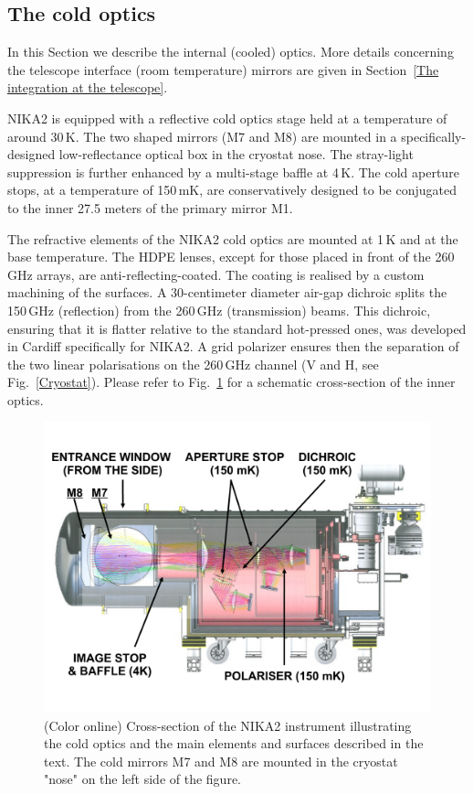 \documentclass[]{aa} %
\begin{document}
 \subsection{The cold optics}

In this Section we describe the internal (cooled) optics. More details concerning the telescope interface (room temperature) mirrors are given in Section~\ref{The integration at the telescope}.

NIKA2 is equipped with a reflective cold optics stage held at a temperature of around 30\,K. The two shaped mirrors (M7 and M8) are mounted in a specifically-designed low-reflectance optical box in the cryostat nose. The stray-light suppression is further enhanced by a multi-stage baffle at 4\,K. The cold aperture stops, at a temperature of 150\,mK, are conservatively designed to be conjugated to the inner 27.5 meters of the primary mirror M1.

The refractive elements of the NIKA2 cold optics are mounted at 1\,K and at the base temperature. The HDPE lenses, except for those placed in front of the 260\,GHz arrays, are anti-reflecting-coated. The coating is realised by a custom machining of the surfaces. A 30-centimeter diameter air-gap dichroic splits the 150\,GHz (reflection) from the 260\,GHz (transmission) beams. This dichroic, ensuring that it is flatter relative to the standard hot-pressed ones, was developed in Cardiff specifically for NIKA2. A grid polarizer ensures then the separation of the two linear polarisations on the 260\,GHz channel (V and H, see Fig.~\ref{Cryostat}). Please refer to Fig.~\ref{Cryostat_optics} for a schematic cross-section of the inner optics.

\begin{figure}[h]
   \centering
   \includegraphics[width=.95\linewidth]{NIKA2_optics.pdf}
      \caption{(Color online) Cross-section of the NIKA2 instrument illustrating the cold optics and the main elements and surfaces described in the text. The cold mirrors M7 and M8 are mounted in the cryostat "nose" on the left side of the figure.}
         \label{Cryostat_optics}
\end{figure}
\end{document}
